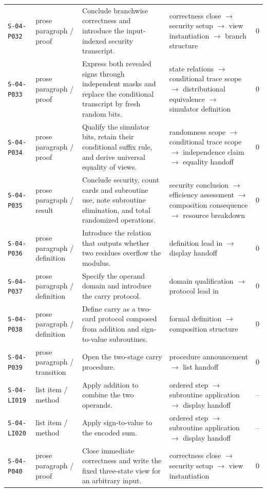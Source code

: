 \documentclass[10pt]{article}
\begin{document}
\begin{longtable}{@{}p{}p{}p{}p{}p{}@{}}
\texttt{S-04-P032}&prose paragraph / proof&Conclude branchwise correctness and introduce the input-indexed security transcript.&correctness close $\rightarrow$ security setup $\rightarrow$ view instantiation $\rightarrow$ branch structure&0\\
\texttt{S-04-P033}&prose paragraph / proof&Express both revealed signs through independent masks and replace the conditional transcript by fresh random bits.&state relations $\rightarrow$ conditional trace scope $\rightarrow$ distributional equivalence $\rightarrow$ simulator definition&0\\
\texttt{S-04-P034}&prose paragraph / proof&Qualify the simulator bits, retain their conditional suffix rule, and derive universal equality of views.&randomness scope $\rightarrow$ conditional trace scope $\rightarrow$ independence claim $\rightarrow$ equality handoff&0\\
\texttt{S-04-P035}&prose paragraph / result&Conclude security, count cards and subroutine use, note subroutine elimination, and total randomized operations.&security conclusion $\rightarrow$ efficiency assessment $\rightarrow$ composition consequence $\rightarrow$ resource breakdown&0\\
\texttt{S-04-P036}&prose paragraph / definition&Introduce the relation that outputs whether two residues overflow the modulus.&definition lead in $\rightarrow$ display handoff&0\\
\texttt{S-04-P037}&prose paragraph / definition&Specify the operand domain and introduce the carry protocol.&domain qualification $\rightarrow$ protocol lead in&0\\
\texttt{S-04-P038}&prose paragraph / definition&Define carry as a two-card protocol composed from addition and sign-to-value subroutines.&formal definition $\rightarrow$ composition structure&0\\
\texttt{S-04-P039}&prose paragraph / transition&Open the two-stage carry procedure.&procedure announcement $\rightarrow$ list handoff&0\\
\texttt{S-04-LI019}&list item / method&Apply addition to combine the two operands.&ordered step $\rightarrow$ subroutine application $\rightarrow$ display handoff&--\\
\texttt{S-04-LI020}&list item / method&Apply sign-to-value to the encoded sum.&ordered step $\rightarrow$ subroutine application $\rightarrow$ display handoff&--\\
\texttt{S-04-P040}&prose paragraph / proof&Close immediate correctness and write the fixed three-state view for an arbitrary input.&correctness close $\rightarrow$ security setup $\rightarrow$ view instantiation&0\\

\end{longtable}
\end{document}
